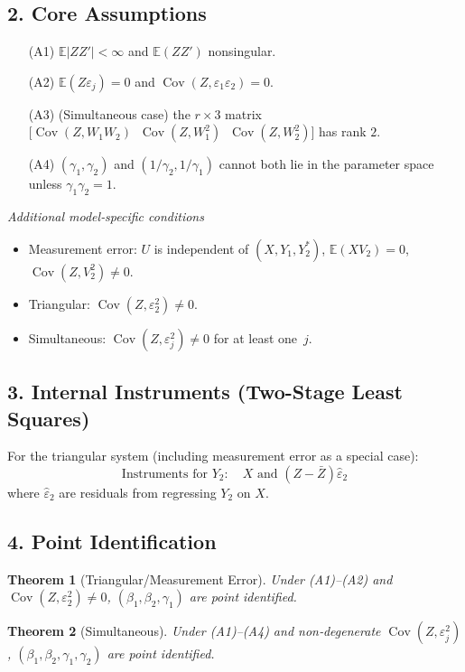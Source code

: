 \documentclass{article}
\newcommand{\E}{\mathbb{E}}
\newcommand{\cov}{\operatorname{Cov}}
\theoremstyle{plain}
\newtheorem{theorem}{Theorem}
\begin{document}
\subsection*{2. Core Assumptions}
\begin{enumerate}
\item[(A1)] $\E|ZZ'|<\infty$ and $\E(ZZ')$ nonsingular.
\item[(A2)] $\E(Z\varepsilon_j)=0$ and $\cov(Z,\varepsilon_1\varepsilon_2)=0$.
\item[(A3)] (Simultaneous case) the $r\times3$ matrix
      $\bigl[\cov(Z,W_1W_2)\;\;\cov(Z,W_1^{2})\;\;\cov(Z,W_2^{2})\bigr]$ has
      rank $2$.
\item[(A4)] $(\gamma_1,\gamma_2)$ and $(1/\gamma_2,1/\gamma_1)$ cannot both
      lie in the parameter space unless $\gamma_1\gamma_2=1$.
\end{enumerate}
\smallskip
\emph{Additional model‑specific conditions}
\begin{itemize}
\item Measurement error: $U$ is independent of $(X, Y_1, Y_2^*)$, $\E(XV_2) = 0$,
      $\cov(Z,V_2^{2})\neq0$.
\item Triangular: $\cov(Z,\varepsilon_2^{2})\neq0$.
\item Simultaneous: $\cov(Z,\varepsilon_j^{2})\neq0$ for at least one~$j$.
\end{itemize}

\subsection*{3. Internal Instruments (Two-Stage Least Squares)}
For the triangular system (including measurement error as a special case):
\[
\text{Instruments for } Y_2: \quad X \text{ and } (Z-\bar{Z})\hat{\varepsilon}_2
\]
where $\hat{\varepsilon}_2$ are residuals from regressing $Y_2$ on $X$.

\subsection*{4. Point Identification}
\begin{theorem}[Triangular/Measurement Error] 
Under (A1)–(A2) and $\cov(Z,\varepsilon_2^{2})\neq0$,
$(\beta_1,\beta_2,\gamma_1)$ are point identified.
\end{theorem}

\begin{theorem}[Simultaneous] 
Under (A1)–(A4) and non‑degenerate $\cov(Z,\varepsilon_j^{2})$,
$(\beta_1,\beta_2,\gamma_1,\gamma_2)$ are point identified.
\end{theorem}
\end{document}
